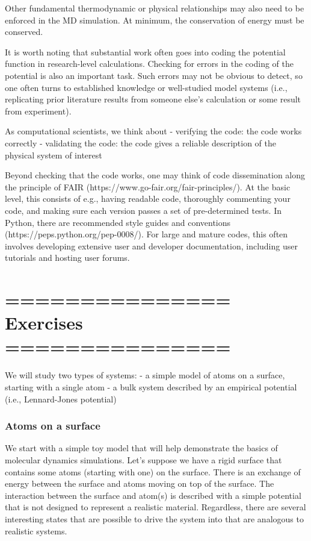 \documentclass[11pt]{article}
\begin{document}
Other fundamental thermodynamic or physical relationships may also need
to be enforced in the MD simulation. At minimum, the conservation of
energy must be conserved.

It is worth noting that substantial work often goes into coding the
potential function in research-level calculations. Checking for errors
in the coding of the potential is also an important task. Such errors
may not be obvious to detect, so one often turns to established
knowledge or well-studied model systems (i.e., replicating prior
literature results from someone else's calculation or some result from
experiment).

As computational scientists, we think about - verifying the code: the
code works correctly - validating the code: the code gives a reliable
description of the physical system of interest

Beyond checking that the code works, one may think of code dissemination
along the principle of FAIR (https://www.go-fair.org/fair-principles/).
At the basic level, this consists of e.g., having readable code,
thoroughly commenting your code, and making sure each version passes a
set of pre-determined tests. In Python, there are recommended style
guides and conventions (https://peps.python.org/pep-0008/). For large
and mature codes, this often involves developing extensive user and
developer documentation, including user tutorials and hosting user
forums.

    \hypertarget{exercises}{%
\section{=============== Exercises ===============}\label{exercises}}

    We will study two types of systems: - a simple model of atoms on a
surface, starting with a single atom - a bulk system described by an
empirical potential (i.e., Lennard-Jones potential)

    \hypertarget{atoms-on-a-surface}{%
\subsubsection{Atoms on a surface}\label{atoms-on-a-surface}}

We start with a simple toy model that will help demonstrate the basics
of molecular dynamics simulations. Let's suppose we have a rigid surface
that contains some atoms (starting with one) on the surface. There is an
exchange of energy between the surface and atoms moving on top of the
surface. The interaction between the surface and atom(s) is described
with a simple potential that is not designed to represent a realistic
material. Regardless, there are several interesting states that are
possible to drive the system into that are analogous to realistic
systems.
\end{document}
